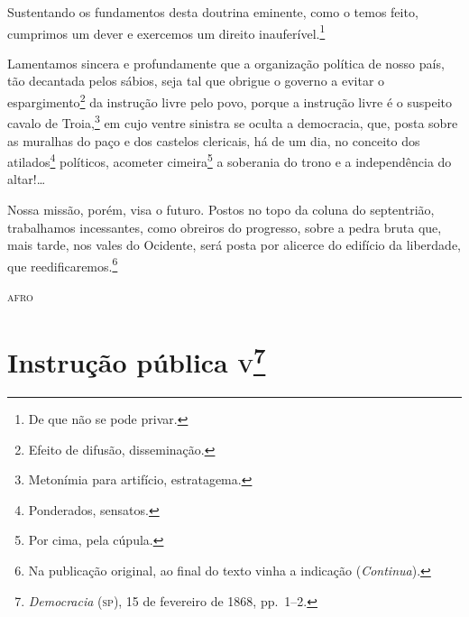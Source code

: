 Sustentando os fundamentos desta doutrina eminente, como o temos feito,
cumprimos um dever e exercemos um direito inauferível.\footnote{De que
  não se pode privar.}

Lamentamos sincera e profundamente que a organização política de nosso
país, tão decantada pelos sábios, seja tal que obrigue o governo a
evitar o espargimento\footnote{Efeito de difusão, disseminação.} da
instrução livre pelo povo, porque a instrução livre é o suspeito cavalo
de Troia,\footnote{Metonímia para artifício, estratagema.} em cujo
ventre sinistra se oculta a democracia, que, posta sobre as muralhas do
paço e dos castelos clericais, há de um dia, no conceito dos
atilados\footnote{Ponderados, sensatos.} políticos, acometer
cimeira\footnote{Por cima, pela cúpula.} a soberania do trono e a
independência do altar!\ldots{}

Nossa missão, porém, visa o futuro. Postos no topo da coluna do
septentrião, trabalhamos incessantes, como obreiros do progresso, sobre
a pedra bruta que, mais tarde, nos vales do Ocidente, será posta por
alicerce do edifício da liberdade, que reedificaremos.\footnote{Na publicação original, ao final do texto vinha a indicação (\emph{Continua}).}



\begin{flushright}
\textsc{afro}
\end{flushright}

\chapter{Instrução pública \textsc{v}\footnote{\emph{Democracia} (\textsc{sp}),
  15 de fevereiro de 1868, pp.~1--2.}} %


